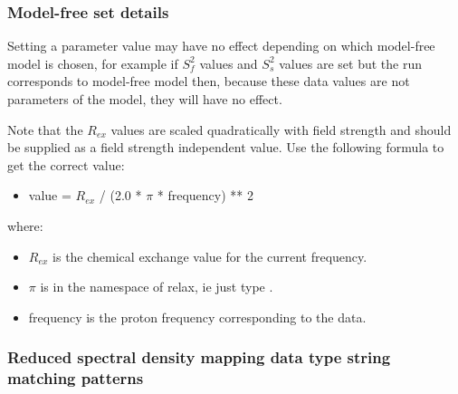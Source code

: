\subsubsection{Model-free set details}

Setting a parameter value may have no effect depending on which model-free model is chosen,
for example if $S^2_f$ values and $S^2_s$ values are set but the run corresponds to model-free model
 then, because these data values are not parameters of the model, they will have no
effect.

Note that the $R_{ex}$ values are scaled quadratically with field strength and should be supplied
as a field strength independent value.  Use the following formula to get the correct value:

\begin{itemize}
\item[]     value = $R_{ex}$ / (2.0 * $\pi$ * frequency) ** 2
\end{itemize}

where:
\begin{itemize}
\item[]     $R_{ex}$ is the chemical exchange value for the current frequency.
\item[]     $\pi$ is in the namespace of relax, ie just type 
.
\item[]     frequency is the proton frequency corresponding to the data.
\end{itemize}



\subsubsection{Reduced spectral density mapping data type string matching patterns}



